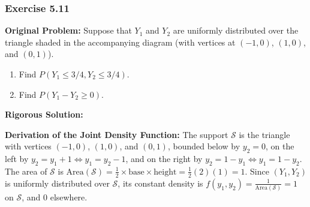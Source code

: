 \documentclass[11pt, letterpaper]{article}
\theoremstyle{definition}
\theoremstyle{remark}
\begin{document}
\bigskip

\subsubsection*{Exercise 5.11}
\textbf{Original Problem:} Suppose that $Y_1$ and $Y_2$ are uniformly distributed over the triangle shaded in the accompanying diagram (with vertices at $(-1, 0)$, $(1, 0)$, and $(0, 1)$).
\begin{enumerate}[label=\textbf{\alph*}]
    \item Find $P(Y_1 \le 3/4, Y_2 \le 3/4)$.
    \item Find $P(Y_1 - Y_2 \ge 0)$.
\end{enumerate}

\textbf{Rigorous Solution:}

\textbf{Derivation of the Joint Density Function:}
The support $\mathcal{S}$ is the triangle with vertices $(-1, 0)$, $(1, 0)$, and $(0, 1)$, bounded below by $y_2 = 0$, on the left by $y_2 = y_1 + 1 \iff y_1 = y_2 - 1$, and on the right by $y_2 = 1 - y_1 \iff y_1 = 1 - y_2$. The area of $\mathcal{S}$ is $\text{Area}(\mathcal{S}) = \frac{1}{2} \times \text{base} \times \text{height} = \frac{1}{2}(2)(1) = 1$. Since $(Y_1, Y_2)$ is uniformly distributed over $\mathcal{S}$, its constant density is $f(y_1, y_2) = \frac{1}{\text{Area}(\mathcal{S})} = 1$ on $\mathcal{S}$, and $0$ elsewhere.
\end{document}
